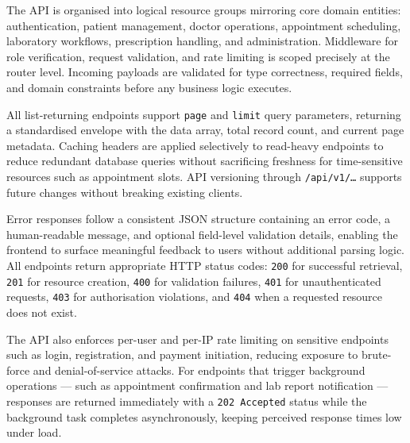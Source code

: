 \noindent
The API is organised into logical resource groups mirroring core domain entities: authentication,
patient management, doctor operations, appointment scheduling, laboratory workflows, prescription
handling, and administration. Middleware for role verification, request validation, and rate
limiting is scoped precisely at the router level. Incoming payloads are validated for type
correctness, required fields, and domain constraints before any business logic executes.

\noindent
All list-returning endpoints support \texttt{page} and \texttt{limit} query parameters,
returning a standardised envelope with the data array, total record count, and current page
metadata. Caching headers are applied selectively to read-heavy endpoints to reduce redundant
database queries without sacrificing freshness for time-sensitive resources such as appointment
slots. API versioning through \texttt{/api/v1/\ldots} supports future changes without breaking
existing clients.

\noindent
Error responses follow a consistent JSON structure containing an error code, a human-readable
message, and optional field-level validation details, enabling the frontend to surface
meaningful feedback to users without additional parsing logic. All endpoints return appropriate
HTTP status codes: \texttt{200} for successful retrieval, \texttt{201} for resource creation,
\texttt{400} for validation failures, \texttt{401} for unauthenticated requests, \texttt{403}
for authorisation violations, and \texttt{404} when a requested resource does not exist.

\noindent
The API also enforces per-user and per-IP rate limiting on sensitive endpoints such as login,
registration, and payment initiation, reducing exposure to brute-force and denial-of-service
attacks. For endpoints that trigger background operations --- such as appointment confirmation
and lab report notification --- responses are returned immediately with a \texttt{202 Accepted}
status while the background task completes asynchronously, keeping perceived response times
low under load.


